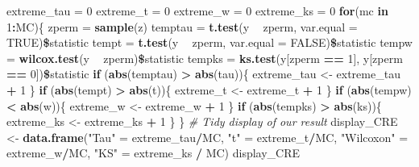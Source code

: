 \documentclass[]{article}
\newenvironment{Shaded}{\begin{snugshade}}{\end{snugshade}}
\newcommand{\KeywordTok}[1]{\textcolor[rgb]{0.13,0.29,0.53}{\textbf{#1}}}
\newcommand{\DataTypeTok}[1]{\textcolor[rgb]{0.13,0.29,0.53}{#1}}
\newcommand{\DecValTok}[1]{\textcolor[rgb]{0.00,0.00,0.81}{#1}}
\newcommand{\StringTok}[1]{\textcolor[rgb]{0.31,0.60,0.02}{#1}}
\newcommand{\CommentTok}[1]{\textcolor[rgb]{0.56,0.35,0.01}{\textit{#1}}}
\newcommand{\OtherTok}[1]{\textcolor[rgb]{0.56,0.35,0.01}{#1}}
\newcommand{\ControlFlowTok}[1]{\textcolor[rgb]{0.13,0.29,0.53}{\textbf{#1}}}
\newcommand{\OperatorTok}[1]{\textcolor[rgb]{0.81,0.36,0.00}{\textbf{#1}}}
\newcommand{\NormalTok}[1]{#1}
\begin{document}
\begin{Shaded}
\begin{Highlighting}[]
\NormalTok{extreme_tau =}\StringTok{ }\DecValTok{0}
\NormalTok{extreme_t =}\StringTok{ }\DecValTok{0}
\NormalTok{extreme_w =}\StringTok{ }\DecValTok{0}
\NormalTok{extreme_ks =}\StringTok{ }\DecValTok{0}
\ControlFlowTok{for}\NormalTok{(mc }\ControlFlowTok{in} \DecValTok{1}\OperatorTok{:}\NormalTok{MC)\{}
\NormalTok{   zperm =}\StringTok{ }\KeywordTok{sample}\NormalTok{(z)}
\NormalTok{   temptau =}\StringTok{ }\KeywordTok{t.test}\NormalTok{(y }\OperatorTok{~}\StringTok{ }\NormalTok{zperm, }\DataTypeTok{var.equal =} \OtherTok{TRUE}\NormalTok{)}\OperatorTok{\$}\NormalTok{statistic }
\NormalTok{   tempt =}\StringTok{ }\KeywordTok{t.test}\NormalTok{(y }\OperatorTok{~}\StringTok{ }\NormalTok{zperm, }\DataTypeTok{var.equal =} \OtherTok{FALSE}\NormalTok{)}\OperatorTok{\$}\NormalTok{statistic}
\NormalTok{   tempw =}\StringTok{ }\KeywordTok{wilcox.test}\NormalTok{(y }\OperatorTok{~}\StringTok{ }\NormalTok{zperm)}\OperatorTok{\$}\NormalTok{statistic }
\NormalTok{   tempks =}\StringTok{ }\KeywordTok{ks.test}\NormalTok{(y[zperm }\OperatorTok{==}\StringTok{ }\DecValTok{1}\NormalTok{], y[zperm }\OperatorTok{==}\StringTok{ }\DecValTok{0}\NormalTok{])}\OperatorTok{\$}\NormalTok{statistic}
   \ControlFlowTok{if}\NormalTok{ (}\KeywordTok{abs}\NormalTok{(temptau) }\OperatorTok{>}\StringTok{ }\KeywordTok{abs}\NormalTok{(tau))\{}
\NormalTok{     extreme_tau <-}\StringTok{ }\NormalTok{extreme_tau }\OperatorTok{+}\StringTok{ }\DecValTok{1}
\NormalTok{   \}}
   \ControlFlowTok{if}\NormalTok{ (}\KeywordTok{abs}\NormalTok{(tempt) }\OperatorTok{>}\StringTok{ }\KeywordTok{abs}\NormalTok{(t))\{}
\NormalTok{     extreme_t <-}\StringTok{ }\NormalTok{extreme_t }\OperatorTok{+}\StringTok{ }\DecValTok{1}
\NormalTok{   \}}
   \ControlFlowTok{if}\NormalTok{ (}\KeywordTok{abs}\NormalTok{(tempw) }\OperatorTok{<}\StringTok{ }\KeywordTok{abs}\NormalTok{(w))\{}
\NormalTok{     extreme_w <-}\StringTok{ }\NormalTok{extreme_w }\OperatorTok{+}\StringTok{ }\DecValTok{1}
\NormalTok{   \}}
   \ControlFlowTok{if}\NormalTok{ (}\KeywordTok{abs}\NormalTok{(tempks) }\OperatorTok{>}\StringTok{ }\KeywordTok{abs}\NormalTok{(ks))\{}
\NormalTok{     extreme_ks <-}\StringTok{ }\NormalTok{extreme_ks }\OperatorTok{+}\StringTok{ }\DecValTok{1}
\NormalTok{   \}}
\NormalTok{\}}
\CommentTok{# Tidy display of our result}
\NormalTok{display_CRE <-}\StringTok{ }\KeywordTok{data.frame}\NormalTok{(}\StringTok{"Tau"}\NormalTok{ =}\StringTok{ }\NormalTok{extreme_tau}\OperatorTok{/}\NormalTok{MC, }\StringTok{"t"}\NormalTok{ =}\StringTok{ }\NormalTok{extreme_t}\OperatorTok{/}\NormalTok{MC, }\StringTok{"Wilcoxon"}\NormalTok{ =}\StringTok{ }\NormalTok{extreme_w}\OperatorTok{/}\NormalTok{MC, }\StringTok{"KS"}\NormalTok{ =}\StringTok{ }\NormalTok{extreme_ks }\OperatorTok{/}\StringTok{ }\NormalTok{MC)}
\NormalTok{display_CRE}
\end{Highlighting}
\end{Shaded}
\end{document}
